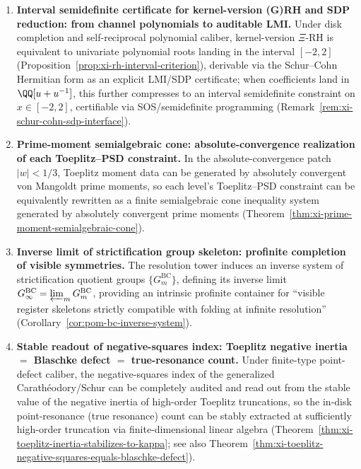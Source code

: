 \begin{enumerate}
  \item \textbf{Interval semidefinite certificate for kernel-version (G)RH and SDP reduction: from channel polynomials to auditable LMI.}
  Under disk completion and self-reciprocal polynomial caliber, kernel-version \(\Xi\)-RH is equivalent to univariate polynomial roots landing in the interval \([-2,2]\) (Proposition~\ref{prop:xi-rh-interval-criterion}), derivable via the Schur--Cohn Hermitian form as an explicit LMI/SDP certificate; when coefficients land in \(\QQ[u+u^{-1}]\), this further compresses to an interval semidefinite constraint on \(x\in[-2,2]\), certifiable via SOS/semidefinite programming (Remark~\ref{rem:xi-schur-cohn-sdp-interface}).

  \item \textbf{Prime-moment semialgebraic cone: absolute-convergence realization of each Toeplitz--PSD constraint.}
  In the absolute-convergence patch \(|w|<1/3\), Toeplitz moment data can be generated by absolutely convergent von Mangoldt prime moments, so each level's Toeplitz--PSD constraint can be equivalently rewritten as a finite semialgebraic cone inequality system generated by absolutely convergent prime moments (Theorem~\ref{thm:xi-prime-moment-semialgebraic-cone}).

  \item \textbf{Inverse limit of strictification group skeleton: profinite completion of visible symmetries.}
  The resolution tower induces an inverse system of strictification quotient groups \(\{G^{\mathrm{BC}}_m\}\), defining its inverse limit \(G^{\mathrm{BC}}_\infty=\varprojlim_m G^{\mathrm{BC}}_m\), providing an intrinsic profinite container for ``visible register skeletons strictly compatible with folding at infinite resolution'' (Corollary~\ref{cor:pom-bc-inverse-system}).

  \item \textbf{Stable readout of negative-squares index: Toeplitz negative inertia \(=\) Blaschke defect \(=\) true-resonance count.}
  Under finite-type point-defect caliber, the negative-squares index of the generalized Carath\'eodory/Schur can be completely audited and read out from the stable value of the negative inertia of high-order Toeplitz truncations, so the in-disk point-resonance (true resonance) count can be stably extracted at sufficiently high-order truncation via finite-dimensional linear algebra (Theorem~\ref{thm:xi-toeplitz-inertia-stabilizes-to-kappa}; see also Theorem~\ref{thm:xi-toeplitz-negative-squares-equals-blaschke-defect}).
\end{enumerate}

